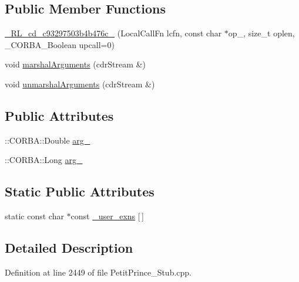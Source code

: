 \subsection*{Public Member Functions}
\begin{DoxyCompactItemize}
\item 
\hyperlink{class__0_r_l__cd__c93297503b4b476c__91000000_a0e586cea7a8d8ceb0da962954cefd98a}{\+\_\+R\+L\+\_\+cd\+\_\+c93297503b4b476c\+\_} (Local\+Call\+Fn lcfn, const char $\ast$op\+\_\+, size\+\_\+t oplen, \+\_\+\+C\+O\+R\+B\+A\+\_\+\+Boolean upcall=0)
\item 
void \hyperlink{class__0_r_l__cd__c93297503b4b476c__91000000_aeb147953bf0294500d507dff3bef0bf2}{marshal\+Arguments} (cdr\+Stream \&)
\item 
void \hyperlink{class__0_r_l__cd__c93297503b4b476c__91000000_a49bf2f2e30667c7fcfa189c0568abaa6}{unmarshal\+Arguments} (cdr\+Stream \&)
\end{DoxyCompactItemize}
\subsection*{Public Attributes}
\begin{DoxyCompactItemize}
\item 
\+::C\+O\+R\+B\+A\+::\+Double \hyperlink{class__0_r_l__cd__c93297503b4b476c__91000000_a87b6d297a7f1a56579d8d3fb6c3070f9}{arg\+\_}
\item 
\+::C\+O\+R\+B\+A\+::\+Long \hyperlink{class__0_r_l__cd__c93297503b4b476c__91000000_a48914b58e05510223789862d5cbd7ec3}{arg\+\_}
\end{DoxyCompactItemize}
\subsection*{Static Public Attributes}
\begin{DoxyCompactItemize}
\item 
static const char $\ast$const \hyperlink{class__0_r_l__cd__c93297503b4b476c__91000000_aa63022c9794a1db3032cf14c0946369e}{\+\_\+user\+\_\+exns} \mbox{[}$\,$\mbox{]}
\end{DoxyCompactItemize}


\subsection{Detailed Description}


Definition at line 2449 of file Petit\+Prince\+\_\+\+Stub.\+cpp.



